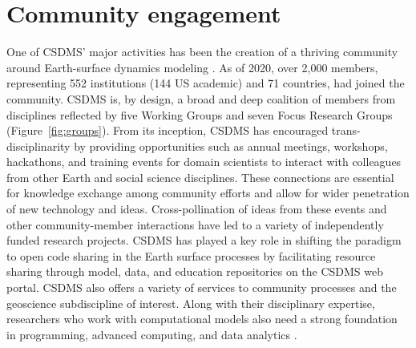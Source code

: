 \documentclass[journal abbreviation, manuscript]{copernicus}
\begin{document}








\section{Community engagement}
\label{sec:community}

One of CSDMS' major activities has been the creation of a thriving community around Earth-surface dynamics modeling \citep{overeem2013strategies}. As of 2020, over 2,000 members, representing 552 institutions (144 US academic) and 71 countries, had joined the community.  CSDMS is, by design, a broad and deep coalition of members from disciplines reflected by five Working Groups and seven Focus Research Groups (Figure~\ref{fig:groups}).  From its inception, CSDMS has encouraged trans-disciplinarity by providing opportunities such as annual meetings, workshops, hackathons, and training events for domain scientists to interact with colleagues from other Earth and social science disciplines.  These connections are essential for knowledge exchange among community efforts and allow for wider penetration of new technology and ideas. Cross-pollination of ideas from these events and other community-member interactions have led to a variety of independently funded research projects. CSDMS has played a key role in shifting the paradigm to open code sharing in the Earth surface processes by facilitating resource sharing through model, data, and education repositories on the CSDMS web portal.  CSDMS also offers a variety of services to community processes and the geoscience subdiscipline of interest.   Along with their disciplinary expertise, researchers who work with computational models also need a strong foundation in programming, advanced computing, and data analytics  \citep{atkins2011national}.
\end{document}
